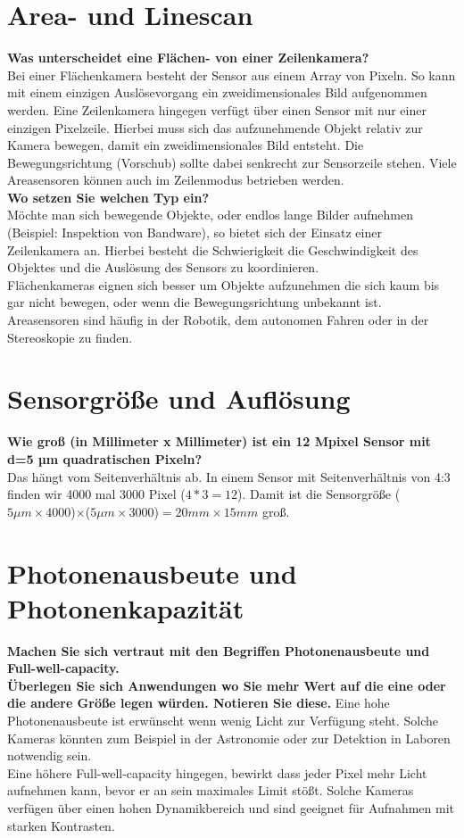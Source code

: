 \documentclass[a4paper]{article}
\begin{document}
	\section{Area- und Linescan}
	\textbf{Was unterscheidet eine Flächen- von einer Zeilenkamera?}\\
	Bei einer Flächenkamera besteht der Sensor aus einem Array von Pixeln. So kann mit einem einzigen Auslösevorgang ein zweidimensionales Bild aufgenommen werden. Eine Zeilenkamera hingegen verfügt über einen Sensor mit nur einer einzigen Pixelzeile. Hierbei muss sich das aufzunehmende Objekt relativ zur Kamera bewegen, damit ein zweidimensionales Bild entsteht. Die Bewegungsrichtung (Vorschub) sollte dabei senkrecht zur Sensorzeile stehen. Viele Areasensoren können auch im Zeilenmodus betrieben werden.\\
	\textbf{Wo setzen Sie welchen Typ ein?}\\
	Möchte man sich bewegende Objekte, oder endlos lange Bilder aufnehmen (Beispiel: Inspektion von Bandware), so bietet sich der Einsatz einer Zeilenkamera an. Hierbei besteht die Schwierigkeit die Geschwindigkeit des Objektes und die Auslösung des Sensors zu koordinieren.\\
	Flächenkameras eignen sich besser um Objekte aufzunehmen die sich kaum bis gar nicht bewegen, oder wenn die Bewegungsrichtung unbekannt ist. Areasensoren sind häufig in der Robotik, dem autonomen Fahren oder in der Stereoskopie zu finden.
	
	\section{Sensorgröße und Auflösung}
	\textbf{Wie groß (in Millimeter x Millimeter) ist ein 12 Mpixel Sensor mit d=5 µm quadratischen
	Pixeln?}\\
	Das hängt vom Seitenverhältnis ab. In einem Sensor mit Seitenverhältnis von 4:3 finden wir 4000 mal 3000 Pixel ($4*3=12$). Damit ist die Sensorgröße ($5\mu m\times 4000$)$\times$($5\mu m\times 3000$)$=20mm \times 15mm$ groß.
	
	\newpage
	
	\section{Photonenausbeute und Photonenkapazität}
	\textbf{Machen Sie sich vertraut mit den Begriffen Photonenausbeute und Full-well-capacity.}\\
	\textbf{Überlegen Sie sich Anwendungen wo Sie mehr Wert auf die eine oder die andere Größe
	legen würden. Notieren Sie diese.}
	Eine hohe Photonenausbeute ist erwünscht wenn wenig Licht zur Verfügung steht. Solche Kameras könnten zum Beispiel in der Astronomie oder zur Detektion in Laboren notwendig sein.\\
	Eine höhere Full-well-capacity hingegen, bewirkt dass jeder Pixel mehr Licht aufnehmen kann, bevor er an sein maximales Limit stößt. Solche Kameras verfügen über einen hohen Dynamikbereich und sind geeignet für Aufnahmen mit starken Kontrasten.
	
\end{document}
